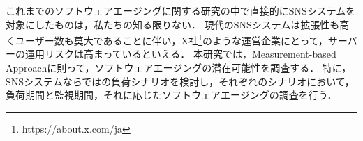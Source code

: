 \documentclass[twoside,twocolumn,10pt]{jarticle}  %
\begin{document}
これまでのソフトウェアエージングに関する研究の中で直接的にSNSシステムを対象にしたものは，私たちの知る限りない．
現代のSNSシステムは拡張性も高くユーザー数も莫大であることに伴い，X社\footnote{https://about.x.com/ja}のような運営企業にとって，サーバーの運用リスクは高まっているといえる．
本研究では，Measurement-based Approach\cite{Dohi2020Handbook}に則って，ソフトウェアエージングの潜在可能性を調査する．
特に，SNSシステムならではの負荷シナリオを検討し，それぞれのシナリオにおいて，負荷期間と監視期間\cite{Torquato2018SWAREa}，それに応じたソフトウェアエージングの調査を行う．
\end{document}
